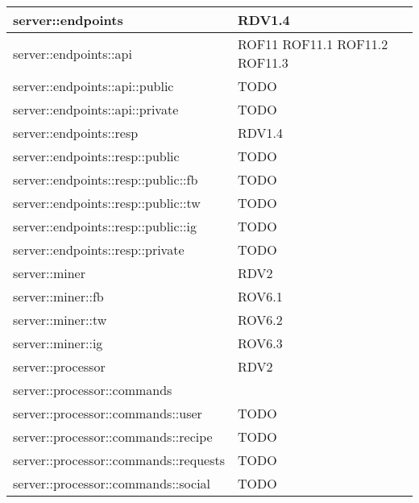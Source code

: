 \begin{center}
\begin{longtable}{| p{9cm} | p{4cm} |}
\hline
server::endpoints  &  RDV1.4 \\
\hline
server::endpoints::api  &  ROF11 \newline ROF11.1 \newline ROF11.2 \newline ROF11.3 \\
\hline
server::endpoints::api::public  &  TODO \\
\hline
server::endpoints::api::private  &  TODO \\
\hline
server::endpoints::resp  &  RDV1.4 \\
\hline
server::endpoints::resp::public  &  TODO \\
\hline
server::endpoints::resp::public::fb  &  TODO \\
\hline
server::endpoints::resp::public::tw  &  TODO \\
\hline
server::endpoints::resp::public::ig  &  TODO \\
\hline
server::endpoints::resp::private  &  TODO \\
\hline
server::miner  & RDV2 \\
\hline
server::miner::fb  &  ROV6.1 \\
\hline
server::miner::tw  &  ROV6.2 \\
\hline
server::miner::ig  &  ROV6.3 \\
\hline
server::processor  & RDV2 \\
\hline
server::processor::commands  &  \\
\hline
server::processor::commands::user  &  TODO \\
\hline
server::processor::commands::recipe  &  TODO \\
\hline
server::processor::commands::requests  &  TODO \\
\hline
server::processor::commands::social  &  TODO \\
\hline
\end{longtable}
\egroup
\end{center}
